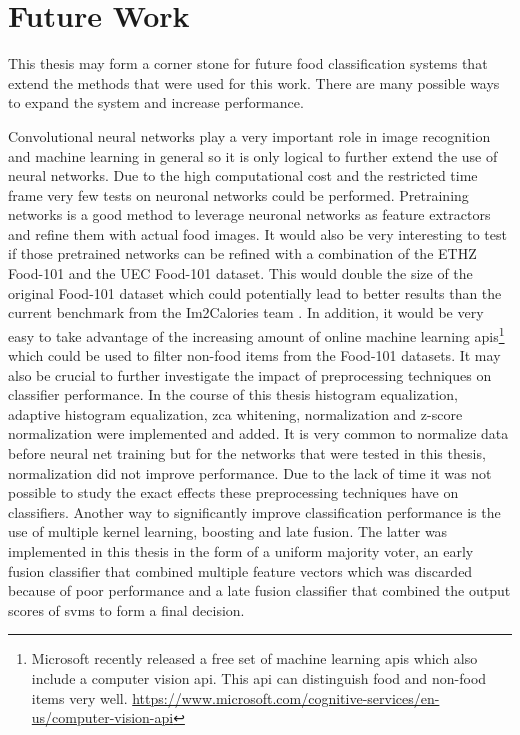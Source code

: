 \section{Future Work}
This thesis may form a corner stone for future food classification systems that extend the methods that were used for this work. There are many possible ways to expand the system and increase performance. 

Convolutional neural networks play a very important role in image recognition and machine learning in general so it is only logical to further extend the use of neural networks. Due to the high computational cost and the restricted time frame very few tests on neuronal networks could be performed. Pretraining networks is a good method to leverage neuronal networks as feature extractors and refine them with actual food images. It would also be very interesting to test if those pretrained networks can be refined with a combination of the ETHZ Food-101 and the UEC Food-101 dataset. This would double the size of the original Food-101 dataset which could potentially lead to better results than the current benchmark from the Im2Calories team \cite{Meyers2015}. In addition, it would be very easy to take advantage of the increasing amount of online machine learning \glspl{api}\footnote{Microsoft recently released a free set of machine learning \glspl{api} which also include a computer vision \gls{api}. This \gls{api} can distinguish food and non-food items very well. \href{https://www.microsoft.com/cognitive-services/en-us/computer-vision-api}{https://www.microsoft.com/cognitive-services/en-us/computer-vision-api}} which could be used to filter non-food items from the Food-101 datasets.
\newline\newline
It may also be crucial to further investigate the impact of preprocessing techniques on classifier performance. In the course of this thesis histogram equalization, adaptive histogram equalization, \gls{zca} whitening, normalization and z-score normalization were implemented and added. It is very common to normalize data before neural net training but for the networks that were tested in this thesis, normalization did not improve performance. Due to the lack of time it was not possible to study the exact effects these preprocessing techniques have on classifiers.
\newline\newline
Another way to significantly improve classification performance is the use of multiple kernel learning, boosting and late fusion. The latter was implemented in this thesis in the form of a uniform majority voter, an early fusion classifier that combined multiple feature vectors which was discarded because of poor performance and a late fusion classifier that combined the output scores of \glspl{svm} to form a final decision. 
